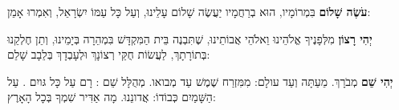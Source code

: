 \textbf{עֹשֶׂה שָׁלוֹם} בִּמְרוֹמָיו, הוּא בְרַחֲמָיו יַעֲשֶׂה שָׁלוֹם עָלֵינוּ, וְעַל כָּל עַמּוֹ יִשְׂרָאֵל, וְאִמְרוּ אָמֵן:

\textbf{יְהִי רָצוֹן} מִלְּפָנֶיךָ \Shem{} אֱלֹהֵינוּ וֵאלֹהֵי אֲבוֹתֵינוּ, שֶׁתִּבְנֶה בֵּית הַמִּקְדָּשׁ בִּמְהֵרָה בְּיָמֵינוּ, וְתֵן חֶלְקֵנוּ בְּתוֹרָתָךְ, לַעֲשׂוֹת חֻקֵּי רְצוֹנָךְ וּלְעָבְדָךְ בְּלֵבָב שָׁלֵם:

\textbf{יְהִי שֵׁם} \Shem{} מְבֹרָךְ. מֵעַתָּה וְעַד עולָם: מִמִּזְרַח שֶׁמֶשׁ עַד מְבואו. מְהֻלָּל שֵׁם \Shem{}: רָם עַל כָּל גּויִם \Shem{}. עַל הַשָּׁמַיִם כְּבוֹדוֹ: \Shem{} אֲדונֵנוּ. מָה אַדִּיר שִׁמְךָ בְּכָל הָאָרֶץ:
